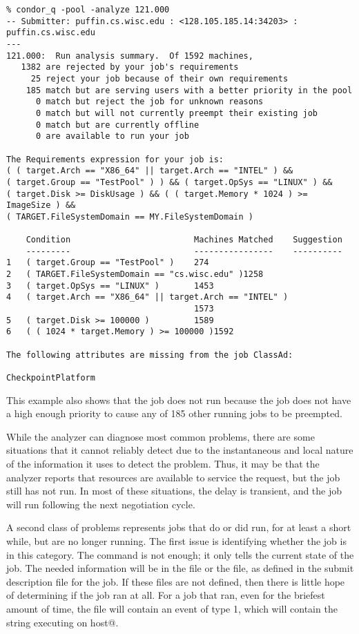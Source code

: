 \footnotesize
\begin{verbatim}
% condor_q -pool -analyze 121.000
-- Submitter: puffin.cs.wisc.edu : <128.105.185.14:34203> : puffin.cs.wisc.edu
---
121.000:  Run analysis summary.  Of 1592 machines,
   1382 are rejected by your job's requirements
     25 reject your job because of their own requirements
    185 match but are serving users with a better priority in the pool
      0 match but reject the job for unknown reasons
      0 match but will not currently preempt their existing job
      0 match but are currently offline
      0 are available to run your job

The Requirements expression for your job is:
( ( target.Arch == "X86_64" || target.Arch == "INTEL" ) &&
( target.Group == "TestPool" ) ) && ( target.OpSys == "LINUX" ) &&
( target.Disk >= DiskUsage ) && ( ( target.Memory * 1024 ) >= ImageSize ) &&
( TARGET.FileSystemDomain == MY.FileSystemDomain )

    Condition                         Machines Matched    Suggestion
    ---------                         ----------------    ----------
1   ( target.Group == "TestPool" )    274                  
2   ( TARGET.FileSystemDomain == "cs.wisc.edu" )1258                 
3   ( target.OpSys == "LINUX" )       1453                 
4   ( target.Arch == "X86_64" || target.Arch == "INTEL" )
                                      1573                 
5   ( target.Disk >= 100000 )         1589                 
6   ( ( 1024 * target.Memory ) >= 100000 )1592                 

The following attributes are missing from the job ClassAd:

CheckpointPlatform

\end{verbatim}
\normalsize

This example also shows that the job does not run because the job
does not have a high enough priority to cause any of 185 other running jobs
to be preempted.

While the analyzer can diagnose most common problems, there are some situations
that it cannot reliably detect due to the instantaneous and local nature of the
information it uses to detect the problem.  Thus, it may be that the analyzer
reports that resources are available to service the request, but the job still 
has not run.  In most of these situations, the delay is transient, and the
job will run following the next negotiation cycle.

A second class of problems represents jobs that do or did run,
for at least a short while, but are no longer running.
The first issue is identifying whether the job is in this category.
The  command is not enough; it only tells the
current state of the job.
The needed information will be in the  file 
or the  file, as defined in the submit description file
for the job.
If these files are not defined, then there is little hope of
determining if the job ran at all.
For a job that ran, even for the briefest amount of time,
the  file will contain an event of type 1,
which will contain the string
\verb@Job executing on host@.

